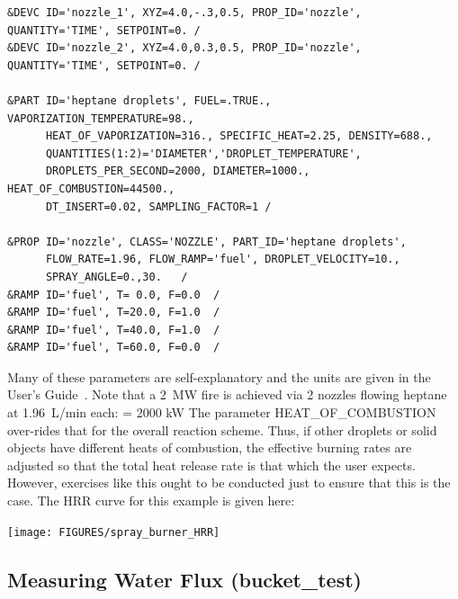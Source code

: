 \documentclass[11pt]{book}
\begin{document}
\footnotesize
\begin{verbatim}
&DEVC ID='nozzle_1', XYZ=4.0,-.3,0.5, PROP_ID='nozzle', QUANTITY='TIME', SETPOINT=0. /
&DEVC ID='nozzle_2', XYZ=4.0,0.3,0.5, PROP_ID='nozzle', QUANTITY='TIME', SETPOINT=0. /

&PART ID='heptane droplets', FUEL=.TRUE., VAPORIZATION_TEMPERATURE=98.,
      HEAT_OF_VAPORIZATION=316., SPECIFIC_HEAT=2.25, DENSITY=688.,
      QUANTITIES(1:2)='DIAMETER','DROPLET_TEMPERATURE',
      DROPLETS_PER_SECOND=2000, DIAMETER=1000., HEAT_OF_COMBUSTION=44500.,
      DT_INSERT=0.02, SAMPLING_FACTOR=1 /

&PROP ID='nozzle', CLASS='NOZZLE', PART_ID='heptane droplets',
      FLOW_RATE=1.96, FLOW_RAMP='fuel', DROPLET_VELOCITY=10.,
      SPRAY_ANGLE=0.,30.   /
&RAMP ID='fuel', T= 0.0, F=0.0  /
&RAMP ID='fuel', T=20.0, F=1.0  /
&RAMP ID='fuel', T=40.0, F=1.0  /
&RAMP ID='fuel', T=60.0, F=0.0  /
\end{verbatim}
\normalsize
Many of these parameters are self-explanatory and the
units are given in the User's Guide~\cite{FDS_Users_Guide_5}. Note
that a 2~MW fire is achieved via 2 nozzles flowing heptane at
1.96~L/min each:
  \;  \times {} \;   \;
 \times {} \;   \;
 = 2000 \; \hbox{kW} \ee
The parameter {\ct HEAT\_OF\_COMBUSTION} over-rides that for the overall reaction scheme. Thus, if other droplets
or solid objects have different heats of combustion, the effective burning rates are adjusted so that the
total heat release rate is that which the user expects. However, exercises like this ought to be conducted just to
ensure that this is the case. The HRR curve for this example is given here:

\begin{center}
\texttt{[image: FIGURES/spray\_burner\_HRR]}
\end{center}



\clearpage

\subsection{Measuring Water Flux ({\bf bucket\_test}) }
\end{document}
